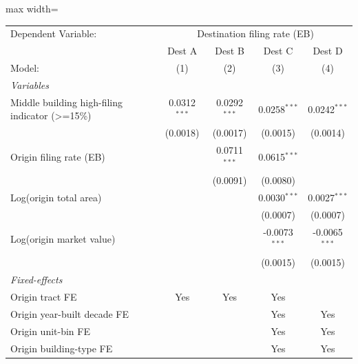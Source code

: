 \documentclass[
  11pt,
]{article}
\begin{document}
\begin{adjustbox}{max width=\textwidth}
\begingroup
\centering
\begin{tabular}{lcccc}
   \tabularnewline \midrule \midrule
   Dependent Variable: & \multicolumn{4}{c}{Destination filing rate (EB)}\\
                                                   & Dest A         & Dest B         & Dest C          & Dest D \\   
   Model:                                          & (1)            & (2)            & (3)             & (4)\\  
   \midrule
   \emph{Variables}\\
   Middle building high-filing indicator (>=15\%)  & 0.0312$^{***}$ & 0.0292$^{***}$ & 0.0258$^{***}$  & 0.0242$^{***}$\\   
                                                   & (0.0018)       & (0.0017)       & (0.0015)        & (0.0014)\\   
   Origin filing rate (EB)                         &                & 0.0711$^{***}$ & 0.0615$^{***}$  &   \\   
                                                   &                & (0.0091)       & (0.0080)        &   \\   
   Log(origin total area)                          &                &                & 0.0030$^{***}$  & 0.0027$^{***}$\\   
                                                   &                &                & (0.0007)        & (0.0007)\\   
   Log(origin market value)                        &                &                & -0.0073$^{***}$ & -0.0065$^{***}$\\   
                                                   &                &                & (0.0015)        & (0.0015)\\   
   \midrule
   \emph{Fixed-effects}\\
   Origin tract FE                                 & Yes            & Yes            & Yes             & \\  
   Origin year-built decade FE                     &                &                & Yes             & Yes\\  
   Origin unit-bin FE                              &                &                & Yes             & Yes\\  
   Origin building-type FE                         &                &                & Yes             & Yes\\  

\end{tabular}
\end{adjustbox}
\end{document}
